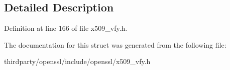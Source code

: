 \subsection{Detailed Description}


Definition at line 166 of file x509\+\_\+vfy.\+h.



The documentation for this struct was generated from the following file\+:\begin{DoxyCompactItemize}
\item 
thirdparty/openssl/include/openssl/x509\+\_\+vfy.\+h\end{DoxyCompactItemize}
